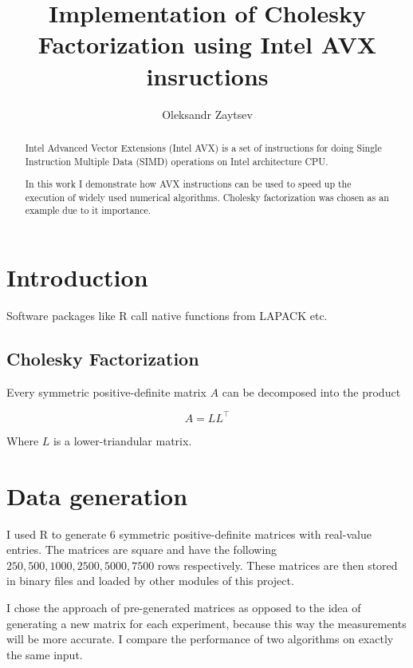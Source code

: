 \documentclass[sigplan]{acmart}
\begin{document}
\title{Implementation of Cholesky Factorization using Intel AVX insructions}

\author{Oleksandr Zaytsev}

\begin{abstract}
Intel Advanced Vector Extensions (Intel AVX) is a set of instructions for doing Single Instruction Multiple Data (SIMD) operations on Intel architecture CPU\cite{lomont-11}.

In this work I demonstrate how AVX instructions can be used to speed up the execution of widely used numerical algorithms. Cholesky factorization was chosen as an example due to it importance.
\end{abstract}


\maketitle

\section{Introduction}
Software packages like R call native functions from LAPACK etc.

\subsection{Cholesky Factorization}
Every symmetric positive-definite matrix $A$ can be decomposed into the product

\[ A = LL^\top \]

Where $L$ is a lower-triandular matrix.

\section{Data generation}
I used R to generate 6 symmetric positive-definite matrices with real-value entries. The matrices are square and have the following $250, 500, 1000, 2500, 5000, 7500$ rows respectively. These matrices are then stored in binary files and loaded by other modules of this project.

I chose the approach of pre-generated matrices as opposed to the idea of generating a new matrix for each experiment, because this way the measurements will be more accurate. I compare the performance of two algorithms on exactly the same input.
\end{document}
